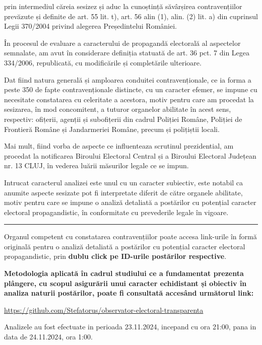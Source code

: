 \documentclass[a4paper,12pt]{article}
\begin{document}
prin intermediul căreia sesizez și aduc la cunoștință săvârșirea contravențiilor prevăzute și definite de art. 55 lit. t), art. 56 alin (1), alin. (2) lit. a) din cuprinsul Legii 370/2004 privind alegerea Președintelui României.

În procesul de evaluare a caracterului de propagandă electorală al aspectelor semnalate, am avut în considerare definiția statuată de art. 36 pct. 7 din Legea 334/2006, republicată, cu modificările și completările ulterioare.

Dat fiind natura generală și amploarea conduitei contravenționale, ce ia forma a peste 350 de fapte contravenționale distincte, cu un caracter efemer, se impune cu necesitate constatarea cu celeritate a acestora, motiv pentru care am procedat la sesizarea, în mod concomitent, a tuturor organelor abilitate în acest sens, respectiv: ofițerii, agenții și subofițerii din cadrul Poliției Române, Poliției de Frontieră Române și Jandarmeriei Române, precum și polițiștii locali.

Mai mult, fiind vorba de aspecte ce influenteaza scrutinul prezidential, am procedat la notificarea Biroului Electoral Central și a Biroului Electoral Județean nr. 13 CLUJ, în vederea luării măsurilor legale ce se impun.

Intrucat caracterul analizei este unul cu un caracter subiectiv, este notabil ca anumite aspecte sesizate pot fi interpretate diferit de către organele abilitate, motiv pentru care se impune o analiză detaliată a postărilor cu potențial caracter electoral propagandistic, în conformitate cu prevederile legale în vigoare.

\noindent\rule{\textwidth}{1pt}

Organul competent cu constatarea contravențiilor poate accesa link-urile în formă originală pentru o analiză detaliată a postărilor cu potențial caracter electoral propagandistic, prin \textbf{dublu click pe ID-urile postărilor respective}.

\textbf{Metodologia aplicată în cadrul studiului ce a fundamentat prezenta plângere, cu scopul asigurării unui caracter echidistant și obiectiv în analiza naturii postărilor, poate fi consultată accesând următorul link:}

\href{https://github.com/Stefatorus/observator-electoral-transparenta}{https://github.com/Stefatorus/observator-electoral-transparenta}

Analizele au fost efectuate in perioada 23.11.2024, incepand cu ora 21:00, pana in data de 24.11.2024, ora 1:00.
\end{document}

